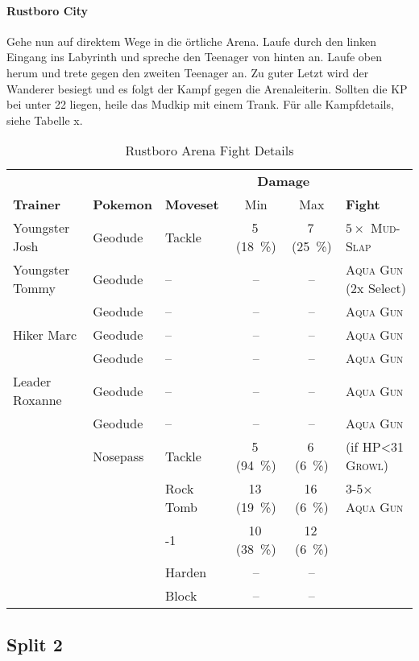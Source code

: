 \documentclass[11pt,a4paper,titlepage]{article}
\begin{document}
\paragraph{Rustboro City}
Gehe nun auf direktem Wege in die örtliche Arena. Laufe durch den linken Eingang ins Labyrinth und spreche den Teenager von hinten an. Laufe oben herum und trete gegen den zweiten Teenager an. Zu guter Letzt wird der Wanderer besiegt und es folgt der Kampf gegen die Arenaleiterin. Sollten die KP bei unter 22 liegen, heile das Mudkip mit einem Trank. Für alle Kampfdetails, siehe Tabelle x.
\begin{table}[htbp]
	\caption{Rustboro Arena Fight Details}
	\label{tab:rustboroarena}
	\centering
	\begin{tabular}{lllccl}
		\toprule 
		&&&\multicolumn{2}{c}{\textbf{Damage}}&\\
		\cmidrule(rl){4-5}
		\textbf{Trainer}&\textbf{Pokemon}&\textbf{Moveset}&Min&Max&\textbf{Fight}\\ 
		\midrule
		Youngster Josh&Geodude&Tackle&5\,(\SI{18}{\percent})&7\,(\SI{25}{\percent})&$5 \times$ \textsc{Mud-Slap}\\
		Youngster Tommy&Geodude&--&--&--&\textsc{Aqua Gun} (2x Select)\\
		&Geodude&--&--&--&\textsc{Aqua Gun}\\
		Hiker Marc&Geodude&--&--&--&\textsc{Aqua Gun}\\
		&Geodude&--&--&--&\textsc{Aqua Gun}\\
		Leader Roxanne&Geodude&--&--&--&\textsc{Aqua Gun}\\
		&Geodude&--&--&--&\textsc{Aqua Gun}\\
		&Nosepass&Tackle&5\,(\SI{94}{\percent})&6\,(\SI{6}{\percent})&(if HP<31 \textsc{Growl})\\
		&&Rock Tomb&13\,(\SI{19}{\percent})&16\,(\SI{6}{\percent})&3-5$\times$ \textsc{Aqua Gun}\\
		&&-1&10\,(\SI{38}{\percent})&12\,(\SI{6}{\percent})&\\
		&&Harden&--&--&\\
		&&Block&--&--&\\	
		\bottomrule
	\end{tabular}
\end{table}

\subsection{Split 2}
\end{document}
